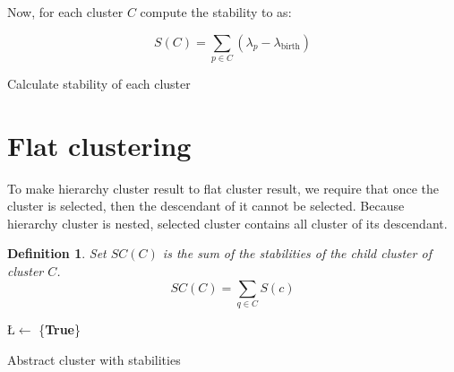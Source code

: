 \documentclass{article}
\newtheorem{definition}{Definition}
\begin{document}
Now, for each cluster $C$ compute the stability to as:
 
$$ S(C) = \sum_{p \in {C}} (\lambda_p - \lambda_{\mathrm{birth}})$$

\begin{algorithm}[H]
	\SetAlgoNoLine
	\caption{Calculate stability of each cluster}
\end{algorithm}

\section{Flat clustering}

To make hierarchy cluster result to flat cluster result, we require that once the cluster is selected, then the descendant of it cannot be selected. Because hierarchy cluster is nested, selected cluster contains all cluster of its descendant.

\begin{tcolorbox}
	\begin{definition}
		Set $SC(C)$ is the sum of the stabilities of the child cluster of cluster $C$.
		$$SC(C) = \sum_{q \in C}S(c)$$
	\end{definition}
\end{tcolorbox}

\begin{algorithm}[H]
	\SetAlgoNoLine
	\L $\leftarrow$ \{\textbf{True}\}\;
	\caption{Abstract cluster with stabilities}
\end{algorithm}
\end{document}
